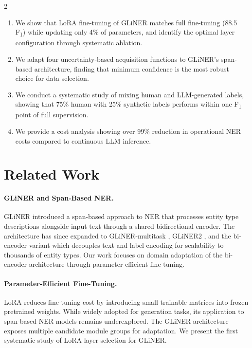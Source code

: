 \documentclass[11pt]{article}
\newcommand{\fone}{F\textsubscript{1}}
\begin{document}
\begin{multicols}{2}
\begin{enumerate}[leftmargin=*, nosep, itemsep=2pt]
    \item We show that LoRA fine-tuning of GLiNER matches full fine-tuning (88.5 \fone{}) while updating only 4\% of parameters, and identify the optimal layer configuration through systematic ablation.
    \item We adapt four uncertainty-based acquisition functions to GLiNER's span-based architecture, finding that minimum confidence is the most robust choice for data selection.
    \item We conduct a systematic study of mixing human and LLM-generated labels, showing that 75\% human with 25\% synthetic labels performs within one \fone{} point of full supervision.
    \item We provide a cost analysis showing over 99\% reduction in operational NER costs compared to continuous LLM inference.
\end{enumerate}

\section{Related Work}

\paragraph{GLiNER and Span-Based NER.}
GLiNER \citep{zaratiana2023gliner} introduced a span-based approach to NER that processes entity type descriptions alongside input text through a shared bidirectional encoder. The architecture has since expanded to GLiNER-multitask \citep{stepanov2024glinermultitask}, GLiNER2 \citep{zaratiana2025gliner2}, and the bi-encoder variant \citep{stepanov2026gliner_bi} which decouples text and label encoding for scalability to thousands of entity types. Our work focuses on domain adaptation of the bi-encoder architecture through parameter-efficient fine-tuning.

\paragraph{Parameter-Efficient Fine-Tuning.}
LoRA \citep{hu2021lora} reduces fine-tuning cost by introducing small trainable matrices into frozen pretrained weights. While widely adopted for generation tasks, its application to span-based NER models remains underexplored. The GLiNER architecture exposes multiple candidate module groups for adaptation. We present the first systematic study of LoRA layer selection for GLiNER.


\end{multicols}
\end{document}
